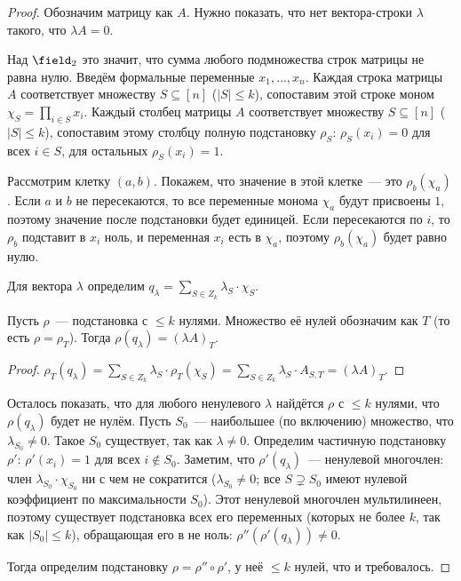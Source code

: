 \begin{proof}
    Обозначим матрицу как $A$. Нужно показать, что нет вектора-строки $\lambda$ такого, что $\lambda A =
    0$.

    Над $\field_2$ это значит, что сумма любого подмножества строк матрицы не равна нулю. Введём
    формальные переменные $x_1, \dots, x_n$. Каждая строка матрицы $A$ соответствует множеству
    $S \subseteq [n]$ ($|S| \le k$), сопоставим этой строке моном $\chi_S = \prod\limits_{i \in S}
    x_i$. Каждый столбец матрицы $A$ соответствует множеству $S \subseteq [n]$ ($|S| \leqslant k$),
    сопоставим этому столбцу полную подстановку $\rho_S$: $\rho_S(x_i) = 0$ для всех $i \in S$, для
    остальных $\rho_S(x_i) = 1$.

    Рассмотрим клетку $(a, b)$. Покажем, что значение в этой клетке~--- это $\rho_b(\chi_a)$. Если $a$ и
    $b$ не пересекаются, то все переменные монома $\chi_a$ будут присвоены $1$, поэтому значение после
    подстановки будет единицей. Если пересекаются по $i$, то $\rho_b$ подставит в $x_i$ ноль, и
    переменная $x_i$ есть в $\chi_a$, поэтому $\rho_b(\chi_a)$ будет равно нулю.

    Для вектора $\lambda$ определим $q_{\lambda} = \sum\limits_{S \in Z_k} \lambda_S \cdot \chi_S$.
    \begin{lemma}
        Пусть $\rho$~--- подстановка с $\le k$ нулями. Множество её нулей обозначим как $T$ (то есть
        $\rho = \rho_T$). Тогда $\rho(q_\lambda) = (\lambda A)_T$.
    \end{lemma}

    \begin{proof}
        $\rho_T(q_\lambda) = \sum\limits_{S\in Z_k} \lambda_S \cdot \rho_T(\chi_S) =
        \sum\limits_{S \in Z_k} \lambda_S \cdot A_{S, T} = (\lambda A)_T$.
    \end{proof}

    Осталось показать, что для любого ненулевого $\lambda$ найдётся $\rho$ с $\le k$ нулями, что
    $\rho(q_\lambda)$ будет не нулём. Пусть $S_0$~--- наибольшее (по включению) множество, что
    $\lambda_{S_0} \neq 0$. Такое $S_0$ существует, так как $\lambda \neq 0$. Определим частичную
    подстановку $\rho'$: $\rho'(x_i) = 1$ для всех $i \not\in S_0$. Заметим, что $\rho'(q_\lambda)$~---
    ненулевой многочлен: член $\lambda_{S_0} \cdot \chi_{S_0}$ ни с чем не сократится ($\lambda_{S_0}
    \neq 0$; все $S \supsetneq S_0$ имеют нулевой коэффициент по максимальности $S_0$). Этот ненулевой
    многочлен мультилинеен, поэтому существует подстановка всех его переменных (которых не более $k$, так
    как $|S_0| \le k$), обращающая его в не ноль: $\rho''(\rho'(q_\lambda)) \neq 0$.

    Тогда определим подстановку $\rho = \rho'' \circ \rho'$, у неё $\le k$ нулей, что и
    требовалось.
\end{proof}


